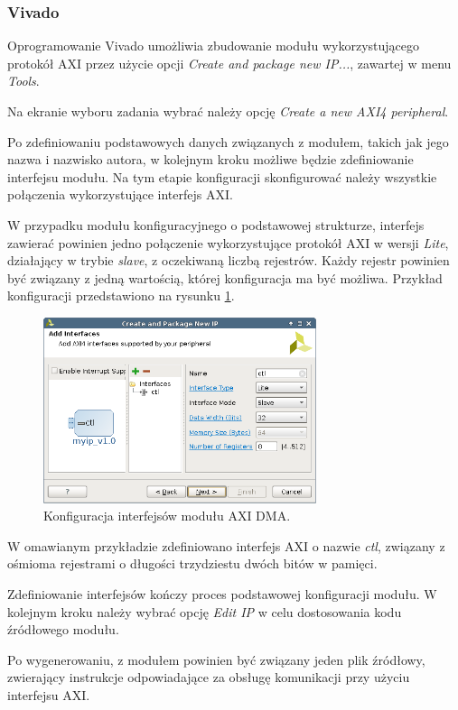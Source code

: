 \subsubsection{Vivado}
Oprogramowanie Vivado umożliwia zbudowanie modułu wykorzystującego protokół AXI przez użycie opcji \emph{Create and package new IP...}, zawartej w menu \emph{Tools}.

Na ekranie wyboru zadania wybrać należy opcję \emph{Create a new AXI4 peripheral}.

Po zdefiniowaniu podstawowych danych związanych z modułem, takich jak jego nazwa i nazwisko autora, w kolejnym kroku możliwe będzie zdefiniowanie interfejsu modułu. Na tym etapie konfiguracji skonfigurować należy wszystkie połączenia wykorzystujące interfejs AXI.

W przypadku modułu konfiguracyjnego o podstawowej strukturze, interfejs zawierać powinien jedno połączenie wykorzystujące protokół AXI w wersji \emph{Lite}, działający w trybie \emph{slave}, z oczekiwaną liczbą rejestrów. Każdy rejestr powinien być związany z jedną wartością, której konfiguracja ma być możliwa. Przykład konfiguracji przedstawiono na rysunku \ref{fig:axi-dma-interfaces-conf}.

\begin{figure}[h]
	\centering
	\includegraphics[width=8cm]{img/vivado/axi-dma-interfaces-conf.png}
	\caption{Konfiguracja interfejsów modułu AXI DMA.}
	\label{fig:axi-dma-interfaces-conf}
\end{figure}

W omawianym przykładzie zdefiniowano interfejs AXI o nazwie \emph{ctl}, związany z ośmioma rejestrami o długości trzydziestu dwóch bitów w pamięci.

Zdefiniowanie interfejsów kończy proces podstawowej konfiguracji modułu. W kolejnym kroku należy wybrać opcję \emph{Edit IP} w celu dostosowania kodu źródłowego modułu.

Po wygenerowaniu, z modułem powinien być związany jeden plik źródłowy, zwierający instrukcje odpowiadające za obsługę komunikacji przy użyciu interfejsu AXI.

